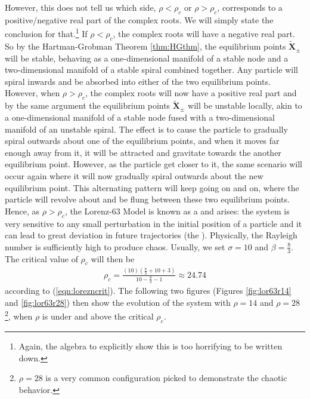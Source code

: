 However, this does not tell us which side, $\rho < \rho_c$ or $\rho > \rho_c$, corresponds to a positive/negative real part of the complex roots. We will simply state the conclusion for that.\footnote{Again, the algebra to explicitly show this is too horrifying to be written down.} If $\rho < \rho_c$, the complex roots will have a negative real part. So by the Hartman-Grobman Theorem \ref{thm:HGthm}, the equilibrium points $\tilde{\textbf{X}}_{\pm}$ will be stable, behaving as a one-dimensional manifold of a stable node and a two-dimensional manifold of a stable spiral combined together. Any particle will spiral inwards and be absorbed into either of the two equilibrium points. However, when $\rho > \rho_c$, the complex roots will now have a positive real part and by the same argument the equilibrium points $\tilde{\textbf{X}}_{\pm}$ will be unstable locally, akin to a one-dimensional manifold of a stable node fused with a two-dimensional manifold of an unstable spiral. The effect is to cause the particle to gradually spiral outwards about one of the equilibrium points, and when it moves far enough away from it, it will be attracted and gravitate towards the another equilibrium point. However, as the particle get closer to it, the same scenario will occur again where it will now gradually spiral outwards about the new equilibrium point. This alternating pattern will keep going on and on, where the particle will revolve about and be flung between these two equilibrium points. Hence, as $\rho > \rho_c$, the Lorenz-63 Model is known as a  and  arises: the system is very sensitive to any small perturbation in the initial position of a particle and it can lead to great deviation in future trajectories (the ). Physically, the Rayleigh number is sufficiently high to produce chaos. Usually, we set $\sigma = 10$ and $\beta = \frac{8}{3}$. The critical value of $\rho_c$ will then be
\begin{align}
\rho_c = \frac{(10)(\frac{8}{3} + 10 + 3)}{10 - \frac{8}{3} - 1} \approx 24.74
\end{align}
according to (\ref{eqn:lorezncrit}). The following two figures (Figures \ref{fig:lor63r14} and \ref{fig:lor63r28}) then show the evolution of the system with $\rho = 14$ and $\rho = 28$\footnote{$\rho = 28$ is a very common configuration picked to demonstrate the chaotic behavior.}, when $\rho$ is under and above the critical $\rho_c$.

